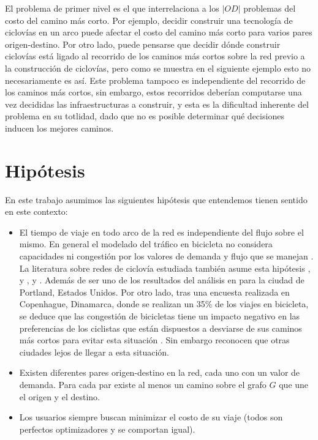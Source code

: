 El problema de primer nivel es el que interrelaciona a los $|OD|$ problemas del costo del camino más corto. Por ejemplo, decidir construir una tecnología de ciclovías en un arco puede afectar el costo del camino más corto para varios pares origen-destino. Por otro lado, puede pensarse que decidir dónde construir ciclovías está ligado al recorrido de los caminos más cortos sobre la red previo a la construcción de ciclovías, pero como se muestra en el siguiente ejemplo esto no necesariamente es así. Este problema tampoco es independiente del recorrido de los caminos más cortos, sin embargo, estos recorridos deberían computarse una vez decididas las infraestructuras a construir, y esta es la dificultad inherente del problema en su totlidad, dado que no es posible determinar qué decisiones inducen los mejores caminos.

\section{Hipótesis}

En este trabajo asumimos las siguientes hipótesis que entendemos tienen sentido en este contexto:

\begin{itemize}
  \item{El tiempo de viaje en todo arco de la red es independiente del flujo sobre el mismo. En general el modelado del tráfico en bicicleta no considera capacidades ni congestión por los valores de demanda y flujo que se manejan \parencite{Sheffi1985}. La literatura sobre redes de ciclovía estudiada también asume esta hipótesis \cite{Lin2013}, \cite{Duthie2014} y \cite{Liu2019}, \cite{Zhu2019} y \cite{baya2021}. Además de ser uno de los resultados del análisis en \cite{broach2012} para la ciudad de Portland, Estados Unidos. Por otro lado, tras una encuesta realizada en Copenhague, Dinamarca, donde se realizan un 35\% de los viajes en bicicleta, se deduce que las congestión de bicicletas tiene un impacto negativo en las preferencias de los ciclistas que están dispuestos a desviarse de sus caminos más cortos para evitar esta situación \parencite{Vedel2017}. Sin embargo reconocen que otras ciudades lejos de llegar a esta situación.}
  \item{Existen diferentes pares origen-destino en la red, cada uno con un valor de demanda. Para cada par existe al menos un camino sobre el grafo $G$ que une el origen y el destino.}
  \item{Los usuarios siempre buscan minimizar el costo de su viaje (todos son perfectos optimizadores y se comportan igual).}
\end{itemize}

